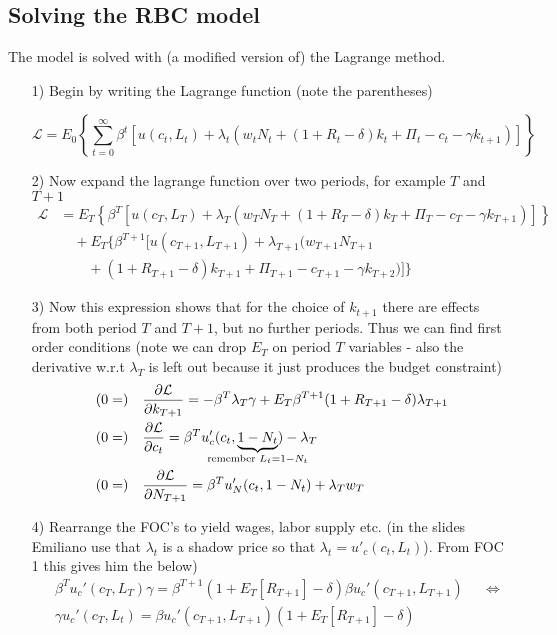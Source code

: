 \documentclass[12pt, a4paper]{article}
\begin{document}
\begin{spacing}{1.213}
\subsection{Solving the RBC model}
The model is solved with (a modified version of) the Lagrange method.
\begin{itemize}
\item[1)] Begin by writing the Lagrange function (note the parentheses)

\begin{equation*}
\mathcal{L} = E_0 \left\{ \sum_{t=0}^{\infty} \beta^t \left[ u(c_t, L_t) + \lambda_t (w_t N_t + (1+R_t - \delta)k_t + \Pi_t - c_t - \gamma k_{t+1}) \right] \right\}
\end{equation*}

\item[2)] Now expand the lagrange function over two periods, for example $T$ and $T+1$
\small
\begin{align*}
\mathcal{L} &= E_T \left\{  \beta^{T} \left[ u(c_{T}, L_{T}) + \lambda_{T} (w_{T} N_{T} + (1+R_{T} - \delta)k_{T} + \Pi_{T} - c_{T} - \gamma k_{T+1}) \right] \right\} \\
& \quad + E_T \big\{  \beta^{T+1} [ u(c_{T+1}, L_{T+1}) + \lambda_{T+1} (w_{T+1} N_{T+1}  \\
& \qquad + (1+R_{T+1} - \delta)k_{T+1} + \Pi_{T+1} - c_{T+1} - \gamma k_{T+2}) ] \big\}
\end{align*}
\normalsize
\item[3)] Now this expression shows that for the choice of $k_{t+1}$ there are effects from both period $T$ and $T+1$, but no further periods. Thus we can find first order conditions (note we can drop $E_{T}$ on period $T$ variables - also the derivative w.r.t $\lambda_T$ is left out because it just produces the budget constraint)
\begin{align*}
& (0=) \quad \frac{\partial \mathcal{L}}{\partial k_{T+1}} = -\beta^T \lambda_T \gamma + E_T \beta^{T+1}(1+ R_{T+1} -\delta)\lambda_{T+1}
\\
& (0=) \quad \frac{\partial \mathcal{L}}{\partial c_t} = \beta^T u'_c(c_t,\underbrace{1-N_t}_{\mathclap{\textrm{remember } L_t = 1- N_t}}) - \lambda_T
\\
& (0=) \quad \frac{\partial \mathcal{L}}{\partial N_{T+1}} = \beta^T u'_{N}(c_t, 1-N_t) + \lambda_T w_T
\end{align*}

\item[4)] Rearrange the FOC's to yield wages, labor supply etc. (in the slides Emiliano use that $\lambda_t$ is a shadow price so that $\lambda_t = u'_c(c_t,L_t)$). From FOC 1 this gives him the below)
\begin{align*}
&\beta^T u_c'(c_T,L_T) \gamma = \beta^{T+1}(1+E_T[R_{T+1}] - \delta)\beta u_c'(c_{T+1},L_{T+1}) && \Leftrightarrow \\
& \gamma u_c'(c_T,L_t) = \beta u_c'(c_{T+1},L_{T+1}) (1 + E_T[R_{T+1}] - \delta)
\end{align*}


\end{itemize}
\end{spacing}
\end{document}

